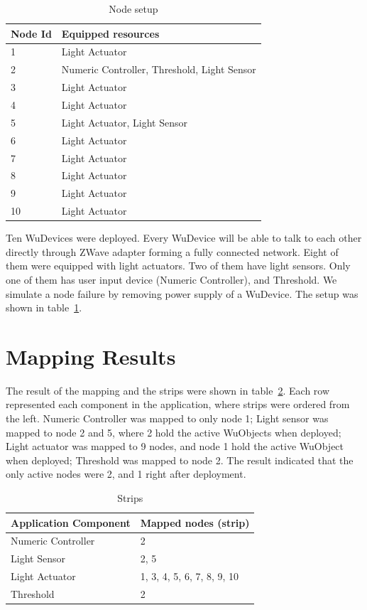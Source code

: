 \begin{table}
\centering
\caption{Node setup}
\label{tbl:setup}
  \begin{tabular}{|l|l|}
  \hline
  \textbf{Node Id} & \textbf{Equipped resources} \\
  \hline
  1 & Light Actuator \\
  \hline
  2 & Numeric Controller, Threshold, Light Sensor \\
  \hline
  3 & Light Actuator \\
  \hline
  4 & Light Actuator \\
  \hline
  5 & Light Actuator, Light Sensor \\
  \hline
  6 & Light Actuator \\
  \hline
  7 & Light Actuator \\
  \hline
  8 & Light Actuator \\
  \hline
  9 & Light Actuator \\
  \hline
  10 & Light Actuator \\
  \hline
  \end{tabular}
\end{table}

Ten WuDevices were deployed. Every WuDevice will be able to talk to each other
directly through ZWave adapter forming a fully connected network. Eight of them
were equipped with light actuators. Two of them have light sensors. Only one of
them has user input device (Numeric Controller), and Threshold. We simulate
a node failure by removing power supply of a WuDevice. The setup was shown in
table~\ref{tbl:setup}.

\section{Mapping Results}

The result of the mapping and the strips were shown in
table~\ref{tbl:mapping-result}. Each row represented each component in the
application, where strips were ordered from the left. Numeric Controller was
mapped to only node 1; Light sensor was mapped to node 2 and 5, where 2 hold the
active WuObjects when deployed; Light actuator was mapped to 9 nodes, and node
1 hold the active WuObject when deployed; Threshold was mapped to node 2.  The
result indicated that the only active nodes were 2, and 1 right after deployment.


\begin{table}
\centering
\caption{Strips}
\label{tbl:mapping-result}
  \begin{tabular}{|l|l|}
  \hline
  \textbf{Application Component} & \textbf{Mapped nodes (strip)} \\
  \hline
  Numeric Controller & 2 \\
  \hline
  Light Sensor & 2, 5 \\
  \hline
  Light Actuator & 1, 3, 4, 5, 6, 7, 8, 9, 10 \\
  \hline
  Threshold & 2 \\
  \hline
  \end{tabular}
\end{table}

